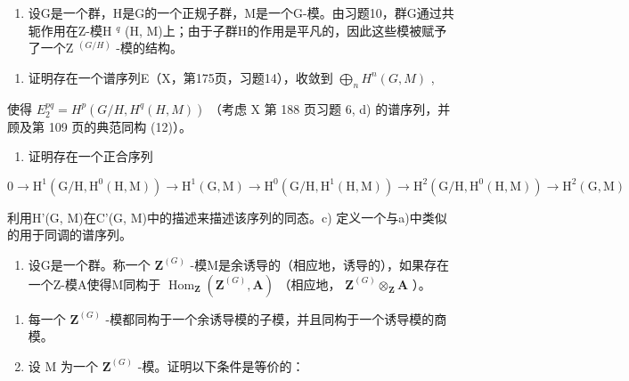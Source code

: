 \begin{enumerate}
\def\labelenumi{\arabic{enumi})}
\setcounter{enumi}{10}
\tightlist
\item
  设G是一个群，H是G的一个正规子群，M是一个G-模。由习题10，群G通过共轭作用在Z-模H \(^{q}\) (H, M)上；由于子群H的作用是平凡的，因此这些模被赋予了一个Z \(^{(G/H)}\) -模的结构。
\end{enumerate}

\begin{enumerate}
\def\labelenumi{\alph{enumi})}
\tightlist
\item
  证明存在一个谱序列E（X，第175页，习题14），收敛到 \(\bigoplus_{n} H^{n}(G, M)\) ,
\end{enumerate}

使得 \(E_{2}^{pq} = H^{p}(G/H, H^{q}(H, M))\) （考虑 X 第 188 页习题 6, d) 的谱序列，并顾及第 109 页的典范同构 (12)）。

\begin{enumerate}
\def\labelenumi{\alph{enumi})}
\setcounter{enumi}{1}
\tightlist
\item
  证明存在一个正合序列
\end{enumerate}

\[
0 \to \mathrm{H} ^ {1} (\mathrm{G} / \mathrm{H}, \mathrm{H} ^ {0} (\mathrm{H}, \mathrm{M})) \to \mathrm{H} ^ {1} (\mathrm{G}, \mathrm{M}) \to \mathrm{H} ^ {0} (\mathrm{G} / \mathrm{H}, \mathrm{H} ^ {1} (\mathrm{H}, \mathrm{M})) \to \mathrm{H} ^ {2} (\mathrm{G} / \mathrm{H}, \mathrm{H} ^ {0} (\mathrm{H}, \mathrm{M})) \to \mathrm{H} ^ {2} (\mathrm{G}, \mathrm{M})
\]

利用H'(G, M)在C'(G, M)中的描述来描述该序列的同态。c) 定义一个与a)中类似的用于同调的谱序列。

\begin{enumerate}
\def\labelenumi{\arabic{enumi})}
\setcounter{enumi}{11}
\tightlist
\item
  设G是一个群。称一个 \(\mathbf{Z}^{(G)}\) -模M是余诱导的（相应地，诱导的），如果存在一个Z-模A使得M同构于 \(\operatorname{Hom}_{\mathbf{Z}}(\mathbf{Z}^{(G)}, \mathbf{A})\) （相应地， \(\mathbf{Z}^{(G)} \otimes_{\mathbf{Z}} \mathbf{A}\) ）。
\end{enumerate}

\begin{enumerate}
\def\labelenumi{\alph{enumi})}
\item
  每一个 \(\mathbf{Z}^{(G)}\) -模都同构于一个余诱导模的子模，并且同构于一个诱导模的商模。
\item
  设 M 为一个 \(\mathbf{Z}^{(G)}\) -模。证明以下条件是等价的：
\end{enumerate}

